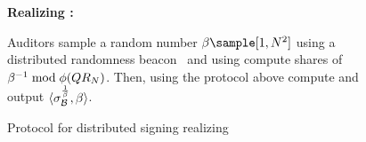 \begin{figure}[h]
{\begin{minipage}[t]{\textwidth}
\smallskip\noindent\textbf{Realizing \distBlind:}

\noindent Auditors sample a random number $\blindingFactor \sample [1, \rsaMod^2]$ using a distributed randomness beacon~\cite{choi2023sok} and using \citet[Fig 3]{catalano2000computing} compute shares of $\beta^{-1} \bmod \phi(QR_{N})$. Then, using the protocol above compute and output $\langle \genericSig[\blocklist]^{\frac{1}{\blindingFactor}}, \blindingFactor  \rangle$.  


\end{minipage}
}
\caption{Protocol for distributed signing realizing \distSigningFunc\label{fig:protocol:dist_sign}}
\end{figure}